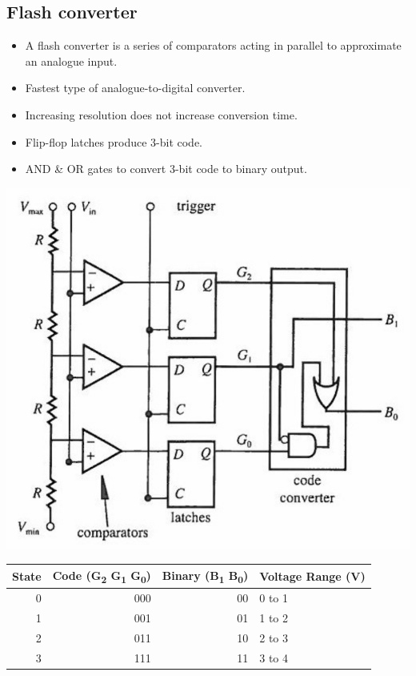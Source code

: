 \documentclass[11pt]{article}
\begin{document}
\subsection{Flash converter}
\label{sec:org60c9d47}
\begin{itemize}
\item A flash converter is a series of comparators acting in parallel to approximate an analogue input.
\item Fastest type of analogue-to-digital converter.
\item Increasing resolution does not increase conversion time.
\item Flip-flop latches produce 3-bit code.
\item AND \& OR gates to convert 3-bit code to binary output.
\end{itemize}

\begin{center}
\includegraphics[width=.9\linewidth]{./images/flash-converter.png}
\end{center}

\begin{center}
\begin{tabular}{r|r|r|l}
State & Code (G\textsubscript{2} G\textsubscript{1} G\textsubscript{0}) & Binary (B\textsubscript{1} B\textsubscript{0}) & Voltage Range (V)\\[0pt]
\hline
0 & 000 & 00 & 0 to 1\\[0pt]
1 & 001 & 01 & 1 to 2\\[0pt]
2 & 011 & 10 & 2 to 3\\[0pt]
3 & 111 & 11 & 3 to 4\\[0pt]
\end{tabular}
\end{center}
\end{document}
